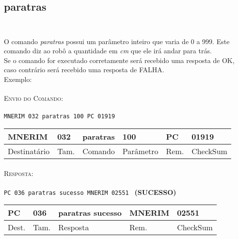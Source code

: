 \documentclass[11pt,	 papera4]{article}
\begin{document}
\subsection*{paratras \\\\}
O comando \textit{paratras} possui um parâmetro inteiro que varia de 0 a 999. 
Este comando diz ao robô a quantidade em \textit{cm} que ele irá andar para trás.\\
Se o comando for executado corretamente será recebido uma resposta de OK, caso contrário será recebido uma resposta de FALHA. \\
\newline
Exemplo: \\\\ \hspace*{0.5cm} 
\textsc{Envio do Comando:} \\\\ \hspace*{2cm}\texttt{MNERIM 032 paratras 100 PC 01919} \\

\begin{table}[h]
	\centering
	\begin{tabular}{p{2cm}p{1cm}p{2cm}p{2cm}p{1cm}p{2cm}}
		\toprule
		MNERIM & 032 & paratras & 100 & PC & 01919 \\
		\midrule	
		Destinatário & Tam. & Comando & Parâmetro & Rem.& CheckSum \\
		\bottomrule
	\end{tabular}
	\label{tab:formatoslatex} %
\end{table}

\paragraph*{\newline\newline}
\hspace*{0.8cm}\textsc{Resposta:} \\\\ \hspace*{2cm}\texttt{PC 036 paratras sucesso MNERIM 02551
} \hspace*{2cm}\textbf{(SUCESSO)}

\begin{table}[h]
	\centering
	\begin{tabular}{p{1cm}p{1cm}p{3cm}p{2cm}p{2cm}}
		\toprule
		PC & 036 &paratras sucesso  & MNERIM & 02551 \\
		\midrule	
		Dest. & Tam. & Resposta & Rem. & CheckSum \\
		\bottomrule
	\end{tabular}
	\label{tab:formatoslatex} %
\end{table}
\end{document}
